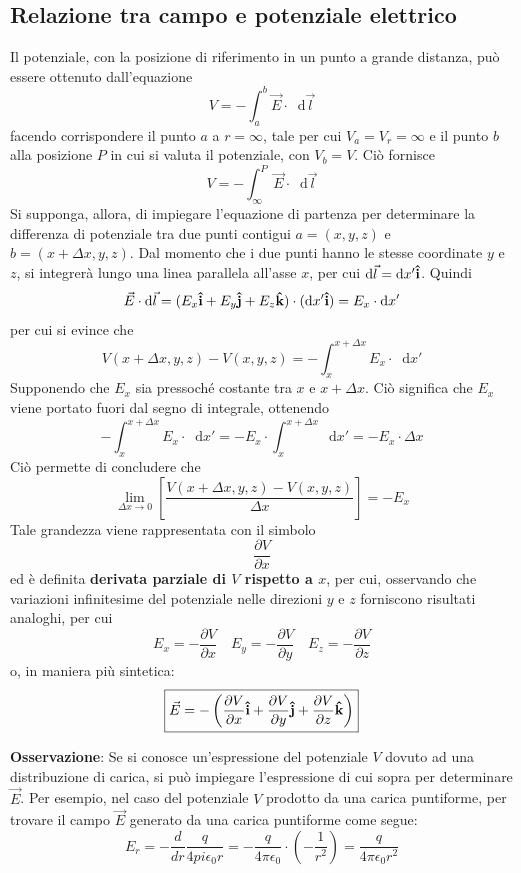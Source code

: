 \documentclass[a4paper]{extarticle}
\newcommand\dif{\mathop{}\!\mathrm{d}}
\begin{document}
\subsection{Relazione tra campo e potenziale elettrico}
Il potenziale, con la posizione di riferimento in un punto a grande distanza, può essere ottenuto dall'equazione
\[V=-\int_a^b\vec E \cdot \dif \vec l\]
facendo corrispondere il punto $a$ a $r=\infty$, tale per cui $V_a=V_r=\infty$ e il punto $b$ alla posizione $P$ in cui si valuta il potenziale, con $V_b=V$. Ciò fornisce
\[V=-\int_\infty^P \vec E \cdot \dif \vec l\]
Si supponga, allora, di impiegare l'equazione di partenza per determinare la differenza di potenziale tra due punti contigui $a=(x,y,z)$ e $b=(x+\Delta x,y,z)$. Dal momento che i due punti hanno le stesse coordinate $y$ e $z$, si integrerà lungo una linea parallela all'asse $x$, per cui $\dif \vec l = \dif x' {\bf{\hat i}}$. Quindi
\[\vec E \cdot \dif \vec l = (E_x {\bf{\hat i}} + E_y {\bf{\hat j}} + E_z {\bf{\hat k}}) \cdot (\dif x' {\bf{\hat i}}) = E_x \cdot \dif x'\]
per cui si evince che
\[V(x+\Delta x,y,z)-V(x,y,z)=-\int_x^{x+\Delta x} E_x \cdot \dif x'\]
Supponendo che $E_x$ sia pressoché costante tra $x$ e $x+\Delta x$. Ciò significa che $E_x$ viene portato fuori dal segno di integrale, ottenendo
\[-\int_x^{x+\Delta x} E_x \cdot \dif x' = - E_x \cdot \int_x^{x+\Delta x} \dif x' = -E_x \cdot \Delta x\]
Ciò permette di concludere che
\[\lim_{\Delta x \to 0} \left[\frac{V(x+\Delta x,y,z)-V(x,y,z)}{\Delta x}\right]=-E_x\]
Tale grandezza viene rappresentata con il simbolo
\[\frac{\partial V}{\partial x}\]
ed è definita \textbf{derivata parziale di $V$ rispetto a $x$}, per cui, osservando che variazioni infinitesime del potenziale nelle direzioni $y$ e $z$ forniscono risultati analoghi, per cui
\[E_x=-\frac{\partial V}{\partial x} \hspace{1em} E_y=-\frac{\partial V}{\partial y} \hspace{1em} E_z=-\frac{\partial V}{\partial z}\]
o, in maniera più sintetica:
\[\boxed{\vec E = - \left(\frac{\partial V}{\partial x} {\bf{\hat i}} + \frac{\partial V}{\partial y} {\bf{\hat j}} + \frac{\partial V}{\partial z} {\bf{\hat k}}\right)}\]

\vspace{1em}
\noindent
\textbf{Osservazione}: Se si conosce un'espressione del potenziale $V$ dovuto ad una distribuzione di carica, si può impiegare l'espressione di cui sopra per determinare $\vec E$. Per esempio, nel caso del potenziale $V$ prodotto da una carica puntiforme, per trovare il campo $\vec E$ generato da una carica puntiforme come segue:
\[E_r = - \frac{d}{dr} \frac{q}{4 pi \epsilon_0 r} = -\frac{q}{4 \pi \epsilon_0} \cdot \left(-\frac{1}{r^2}\right) = \frac{q}{4 \pi \epsilon_0 r^2}\]
\end{document}

